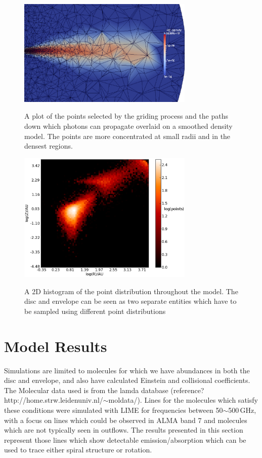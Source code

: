 \documentclass[useAMS,usenatbib]{mn2e}
\begin{document}
\begin{figure}
 \includegraphics[width=84mm]{Figures/model/Lime_grid3.eps}
 \label{grid}
 \caption{A plot of the points selected by the griding process and the paths down which photons can propagate overlaid on a smoothed density model. The points are more concentrated at small radii and in the densest regions.}
\end{figure}

\begin{figure}
 \includegraphics[width=84mm]{Figures/model/lime_points_rz_histo2.eps}
 \label{points}
 \caption{A 2D histogram of the point distribution throughout the model. The disc and envelope can be seen as two separate entities which have to be sampled using different point distributions}
\end{figure}

\section{Model Results} \label{sec:model_results}

Simulations are limited to molecules for which we have abundances in both the disc and envelope, and also have calculated Einstein and collisional coefficients. The Molecular data used is from the lamda database (reference? http://home.strw.leidenuniv.nl/$\sim$moldata/). Lines for the molecules which satisfy these conditions were simulated with LIME for frequencies between 50$\sim$500$\,$GHz, with a focus on lines which could be observed in ALMA band 7 and molecules which are not typically seen in outflows. The results presented in this section represent those lines which show detectable emission/absorption which can be used to trace either spiral structure or rotation.\newline
\end{document}
